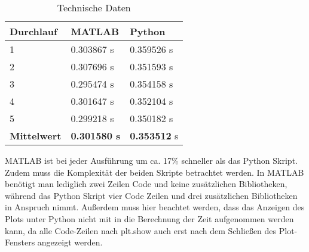 


\begin{table}[H]
	\centering
	\caption{Technische Daten}
	\begin{tabular}{|l|l|l|}
		\multicolumn{1}{l}{\textbf{Durchlauf}} & \multicolumn{1}{l}{\textbf{MATLAB}} & \multicolumn{1}{l}{\textbf{Python}}  \\ 
		\hline
		1                                      & 0.303867 s                          & 0.359526
		s                           \\ 
		\hline
		2                                      & 0.307696
		s                          & 0.351593
		s                           \\ 
		\hline
		3                                      & 0.295474
		s                          & 0.354158
		s                           \\ 
		\hline
		4                                      & 0.301647 s                          & 0.352104 s                           \\ 
		\hline
		5                                      & 0.299218 s                          & 0.350182 s                           \\ 
		\hline
		\textbf{Mittelwert}                    & \textbf{0.301580 s}                          & \textbf{0.353512} s                           \\
		\hline
	\end{tabular}
\end{table}

MATLAB ist bei jeder Ausführung um ca. 17\% schneller als das Python Skript. Zudem muss die Komplexität der beiden Skripte betrachtet werden. In MATLAB benötigt man lediglich zwei Zeilen Code und keine zusätzlichen Bibliotheken, während das Python Skript  vier Code Zeilen und drei zusätzlichen Bibliotheken in Anspruch nimmt. Außerdem muss hier beachtet werden, dass das Anzeigen des Plots unter Python nicht mit in die Berechnung der Zeit aufgenommen werden kann, da alle Code-Zeilen nach \glqq plt.show\grqq{} auch erst nach dem Schließen des Plot-Fensters angezeigt werden.

